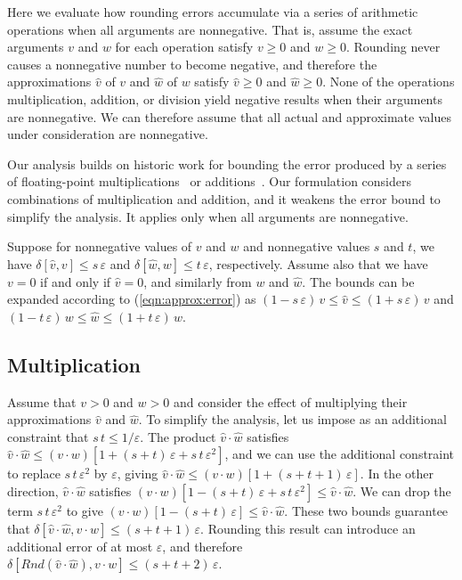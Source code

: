 \documentclass{easychair}
\newcommand{\approximate}[1]{\hat{#1}}
\newcommand{\approxv}{\approximate{v}}
\newcommand{\approxw}{\approximate{w}}
\newcommand{\round}{\mathit{Rnd}}
\newcommand{\aerror}{\delta}
\newcommand{\roundepsilon}{\varepsilon}
\begin{document}
Here we evaluate how rounding errors accumulate via a series of
arithmetic operations when all arguments are nonnegative.
That is, assume the exact arguments $v$ and $w$ for each operation satisfy $v \geq 0$ and $w \geq 0$.
Rounding never causes a nonnegative number to become negative, and therefore 
the approximations $\approxv$ of  $v$ and $\approxw$ of $w$ satisfy $\approxv \geq 0$ and $\approxw \geq 0$.
None of the operations multiplication, addition, or division yield negative results when their arguments are nonnegative.
We can therefore
assume that all actual and approximate values under consideration are
nonnegative.

Our analysis builds on historic work for bounding the error produced
by a series of floating-point
multiplications~\cite{muller:hfpa:2018,rump:bit:2015,wilkinson:nm:1960,wilkinson:rounding:1964} or
additions~\cite{higham:siam:1993}.  Our formulation considers combinations of multiplication and addition, and it weakens the error bound to simplify the analysis.
It
applies only when all arguments are nonnegative.

Suppose for nonnegative values of $v$ and $w$ and nonnegative values $s$ and $t$, we have
$\aerror[\approxv, v] \leq s\, \roundepsilon$ and
$\aerror[\approxw, w] \leq t\, \roundepsilon$, respectively.  Assume also that we have $v = 0$ if and only if $\approxv = 0$, and similarly from $w$ and $\approxw$.
The bounds can be expanded according to (\ref{eqn:approx:error}) as
$(1-s\,\roundepsilon)\, v \leq \approxv \leq (1+s\,\roundepsilon)\, v$ and
$(1-t\,\roundepsilon)\, w \leq \approxw \leq (1+t\,\roundepsilon)\, w$.


\subsection{Multiplication}

Assume that $v > 0$ and $w > 0$ and consider the effect of multiplying their approximations
$\approxv$ and $\approxw$.  To simplify the analysis, let us impose as an additional constraint that $s\,t \leq 1/\roundepsilon$.
The product $\approxv \cdot \approxw$  satisfies
$\approxv \cdot \approxw \leq (v\cdot w) [1 + (s+t)\,\roundepsilon + s\,t\,\roundepsilon^2]$, and we can use the additional constraint to replace $s\,t\,\roundepsilon^2$ by $\roundepsilon$,
giving
$\approxv \cdot \approxw \leq (v\cdot w) [1 + (s+t+1)\,\roundepsilon]$.
In the other direction, $\approxv \cdot \approxw$ satisfies
$(v\cdot w) [1 - (s+t)\,\roundepsilon + s\,t\,\roundepsilon^2] \leq \approxv \cdot \approxw$.  We can drop the term
$s\,t\,\roundepsilon^2$ to give
$(v\cdot w) [1 - (s+t)\,\roundepsilon] \leq \approxv \cdot \approxw$.  These two bounds guarantee that
$\aerror[\approxv \cdot \approxw, v \cdot w] \leq (s+t+1)\,\roundepsilon$.
Rounding this result can introduce an additional error of at most $\roundepsilon$, and therefore
$\aerror[\round(\approxv \cdot \approxw), v \cdot w] \leq (s+t+2)\,\roundepsilon$.
\end{document}
